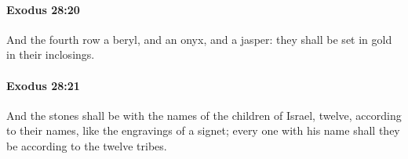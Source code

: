 		\paragraph{Exodus 28:20} %
			\label{EXODUS-28-20}

			And the fourth row a beryl, and an onyx, and a jasper: they shall be set in gold in their inclosings.


		\paragraph{Exodus 28:21} %
			\label{EXODUS-28-21}

			And the stones shall be with the names of the children of Israel, twelve, according to their names, like the engravings of a signet; every one with his name shall they be according to the twelve tribes.


